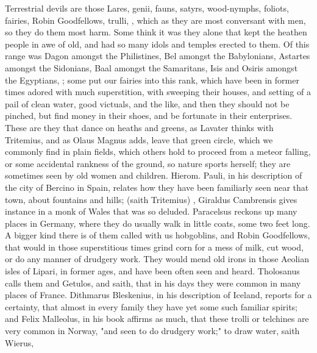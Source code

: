 Terrestrial devils are those Lares, genii, fauns, satyrs,
wood-nymphs, foliots, fairies, Robin Goodfellows, trulli,
\etc{}, which as they are most conversant with men, so they do them most harm.
Some think it was they alone that kept the heathen people in awe of old, and
had so many idols and temples erected to them. Of this range was Dagon amongst
the Philistines, Bel amongst the Babylonians, Astartes amongst the Sidonians,
Baal amongst the Samaritans, Isis and Osiris amongst the Egyptians, \etc{};
some put our fairies into this rank, which have been in
former times adored with much superstition, with sweeping their houses, and
setting of a pail of clean water, good victuals, and the like, and then they
should not be pinched, but find money in their shoes, and be fortunate in their
enterprises. These are they that dance on heaths and greens, as
Lavater thinks with Tritemius, and as
Olaus Magnus adds, leave that green circle, which we
commonly find in plain fields, which others hold to proceed from a meteor
falling, or some accidental rankness of the ground, so nature sports herself;
they are sometimes seen by old women and children. Hierom. Pauli, in his
description of the city of Bercino in Spain, relates how they have been
familiarly seen near that town, about fountains and hills; 
(saith Tritemius) , \etc{} Giraldus Cambrensis gives instance in
a monk of Wales that was so deluded. Paracelsus reckons up
many places in Germany, where they do usually walk in little coats, some two
feet long. A bigger kind there is of them called with us hobgoblins, and Robin
Goodfellows, that would in those superstitious times grind corn for a mess of
milk, cut wood, or do any manner of drudgery work. They would mend old irons in
those Aeolian isles of Lipari, in former ages, and have been often seen and
heard. Tholosanus calls them  and Getulos, and
saith, that in his days they were common in many places of France. Dithmarus
Bleskenius, in his description of Iceland, reports for a certainty, that almost
in every family they have yet some such familiar spirits; and Felix Malleolus,
in his book  affirms as much, that
these trolli or telchines are very common in Norway, "and
seen to do drudgery work;" to draw water, saith Wierus,
